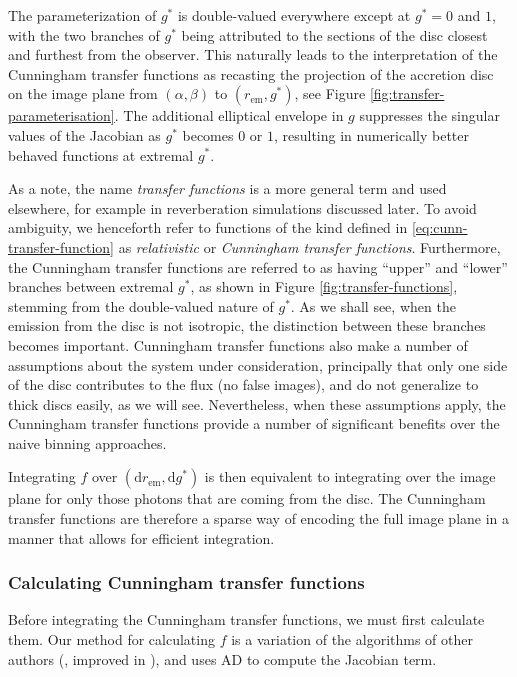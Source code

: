 \documentclass[fleqn,usenatbib]{mnras}
\renewcommand{\d}{\text{d}}
\begin{document}
The parameterization of $g^\ast$ is double-valued everywhere except at $g^\ast =
0$ and $1$, with the two branches of $g^\ast$ being attributed to the sections of the
disc closest and furthest from the observer. This naturally leads to the
interpretation of the Cunningham transfer functions as recasting the projection
of the accretion disc on the image plane from $(\alpha, \beta)$ to
$(r_\text{em}, g^\ast)$, see Figure \ref{fig:transfer-parameterisation}.  The
additional elliptical envelope in $g$ suppresses the singular values of the
Jacobian as $g^\ast$ becomes $0$ or $1$, resulting in numerically better behaved
functions at extremal $g^\ast$.

As a note, the name \emph{transfer functions} is a more general term and used
elsewhere, for example in reverberation simulations discussed later. To avoid
ambiguity, we henceforth refer to functions of the kind defined in
\eqref{eq:cunn-transfer-function} as \emph{relativistic} or \emph{Cunningham
transfer functions}. Furthermore, the Cunningham transfer functions are referred
to as having ``upper'' and ``lower'' branches between extremal $g^\ast$, as
shown in Figure \ref{fig:transfer-functions}, stemming from the double-valued
nature of $g^\ast$. As we shall see, when the emission from the disc is not
isotropic, the distinction between these branches becomes important. Cunningham
transfer functions also make a number of assumptions about the system under
consideration, principally that only one side of the disc contributes to the
flux (no false images), and do not generalize to thick discs easily, as we will
see. Nevertheless, when these assumptions apply, the Cunningham transfer
functions provide a number of significant benefits over the naive binning
approaches.

Integrating $f$ over $(\d r_\text{em}, \d g^\ast)$ is then equivalent to
integrating over the image plane for only those photons that are coming from the
disc. The Cunningham transfer functions are therefore a sparse way of encoding
the full image plane in a manner that allows for efficient integration.

\subsubsection{Calculating Cunningham transfer functions}

Before integrating the Cunningham transfer functions, we must first calculate
them. Our method for calculating $f$ is a variation of the algorithms of other
authors (\citealp{speith_photon_1995,bambi_testing_2017}, improved in
\citealp{abdikamalov_public_2019}), and uses AD to compute the Jacobian term.
\end{document}
